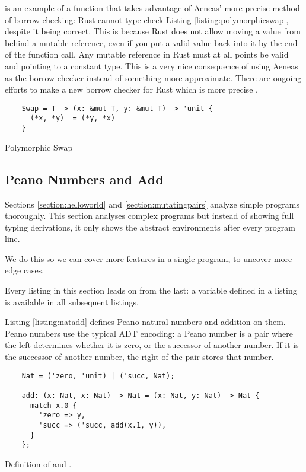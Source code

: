 \documentclass[12pt,twoside]{report}
\begin{document}
 is an example of a function that takes advantage of Aeneas' more precise method of borrow checking: Rust cannot type check Listing \ref{listing:polymorphicswap}, despite it being correct. This is because Rust does not allow moving a value from behind a mutable reference, even if you put a valid value back into it by the end of the function call. Any mutable reference in Rust must at all points be valid and pointing to a constant type. This is a very nice consequence of using Aeneas as the borrow checker instead of something more approximate. There are ongoing efforts to make a new borrow checker for Rust which is more precise \citep{PoloniusCurrentStatus}.

\begin{listing}
  \begin{verbatim}
    Swap = T -> (x: &mut T, y: &mut T) -> 'unit {
      (*x, *y)  = (*y, *x)
    }
  \end{verbatim}
  \caption{Polymorphic Swap}
  \label{listing:polymorphicswap}
\end{listing}


\subsection{Peano Numbers and Add}
Sections \ref{section:helloworld} and \ref{section:mutatingpairs} analyze simple programs thoroughly. This section analyses complex programs but instead of showing full typing derivations, it only shows the abstract environments after every program line.

We do this so we can cover more features in a single program, to uncover more edge cases.

Every listing in this section leads on from the last: a variable defined in a listing is available in all subsequent listings.

Listing \ref{listing:natadd} defines Peano natural numbers and addition on them. Peano numbers use the typical ADT encoding: a Peano number is a pair where the left determines whether it is zero, or the successor of another number. If it is the successor of another number, the right of the pair stores that number.

\begin{listing}
  \begin{verbatim}
    Nat = ('zero, 'unit) | ('succ, Nat);

    add: (x: Nat, x: Nat) -> Nat = (x: Nat, y: Nat) -> Nat {
      match x.0 {
        'zero => y,
        'succ => ('succ, add(x.1, y)),
      }
    };
  \end{verbatim}
  \caption{Definition of  and .}
  \label{listing:natadd}
\end{listing}
\end{document}
